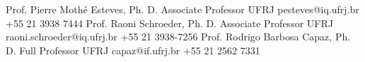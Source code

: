 %
%
%


\begin{referees}
		{Prof. Pierre Mothé Esteves, Ph. D.}
		{Associate Professor}
		{UFRJ}
		{pesteves@iq.ufrj.br}
		{+55 21 3938 7444}
		{Prof. Raoni Schroeder, Ph. D.}
		{Associate Professor}
		{UFRJ}
		{raoni.schroeder@iq.ufrj.br}
		{+55 21 3938-7256}
		{Prof. Rodrigo Barbosa Capaz, Ph. D.}
		{Full Professor}
		{UFRJ}
		{capaz@if.ufrj.br}
		{+55 21 2562 7331}
\end{referees}